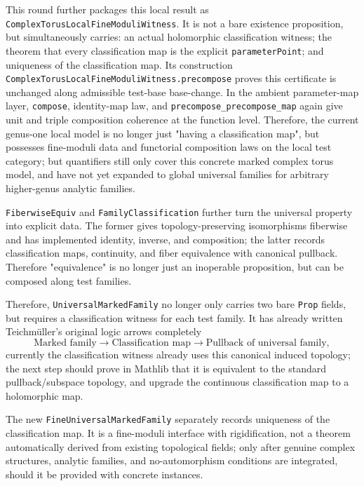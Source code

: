 \documentclass[UTF8,a4paper,11pt]{article}
\begin{document}
This round further packages this local result as
\texttt{ComplexTorusLocalFineModuliWitness}. It is not a bare existence proposition, but simultaneously carries:
an actual holomorphic classification witness; the theorem that every classification map is the explicit
\texttt{parameterPoint}; and uniqueness of the classification map.
Its construction
\texttt{ComplexTorusLocalFineModuliWitness.precompose} proves this certificate is unchanged along admissible test-base base-change.
In the ambient parameter-map layer, \texttt{compose}, identity-map law, and
\texttt{precompose\_precompose\_map} again give unit and triple composition coherence at the function level. Therefore, the current
genus-one local model is no longer just "having a classification map", but possesses fine-moduli data and
functorial composition laws on the local test category; but quantifiers still only cover this concrete marked complex torus model, and have not yet expanded to global universal families for arbitrary higher-genus analytic families.

\texttt{FiberwiseEquiv} and \texttt{FamilyClassification} further turn the universal property into explicit data. The former gives topology-preserving isomorphisms fiberwise and has implemented identity, inverse, and composition; the latter records classification maps, continuity, and fiber equivalence with canonical pullback. Therefore "equivalence" is no longer just an inoperable proposition, but can be composed along test families.

Therefore, \texttt{UniversalMarkedFamily} no longer only carries two bare \texttt{Prop} fields, but requires a classification witness for each test family. It has already written Teichmüller's original logic arrows completely
\[
  \text{Marked family}\longrightarrow\text{Classification map}\longrightarrow\text{Pullback of universal family},
\]
currently the classification witness already uses this canonical induced topology; the next step should prove in Mathlib that it is equivalent to the standard pullback/subspace topology, and upgrade the continuous classification map to a holomorphic map.

The new \texttt{FineUniversalMarkedFamily} separately records uniqueness of the classification map. It is a fine-moduli interface with rigidification, not a theorem automatically derived from existing topological fields; only after genuine complex structures, analytic families, and no-automorphism conditions are integrated, should it be provided with concrete instances.
\end{document}

